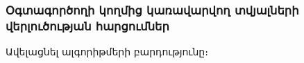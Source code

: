 \subsubsection*{Օգտագործողի կողմից կառավարվող տվյալների վերլուծության հարցումներ}\label{subsubsec:taintAnalisys}
Ավելացնել ալգորիթմերի բարդությունը։